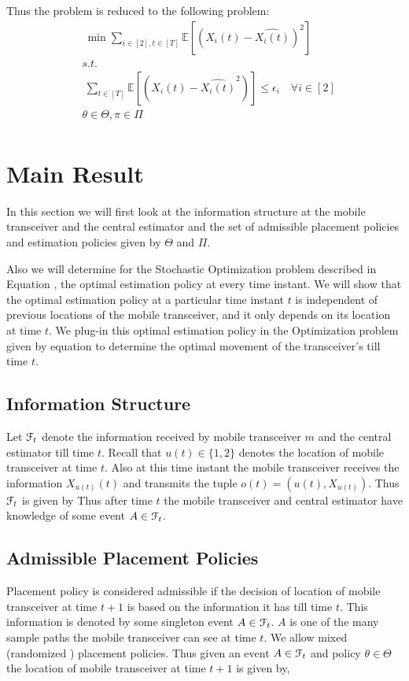 \documentclass[a4paper,english,12pt]{article}
\begin{document}
Thus the problem is reduced to the following problem:
\begin{align}\label{Opt}
& \ \min \sum_{i \in [2], t \in [T]} \mathbb{E}[ (X_i(t)-\hat{X_i(t)})^2]\\
& s.t. \nonumber\\
 &\ \sum_{t \in [T]} \mathbb{E}[(X_i(t)-\hat{X_i(t)}^2)] \leq \epsilon_i \quad \forall i \in [2] \nonumber\\
& \theta \in \Theta , \pi \in \Pi\nonumber\\
\nonumber
\end{align}

\section{Main Result}
In this section we  will first look at the information structure at the mobile transceiver and the central estimator and the set of admissible placement policies and estimation policies given by $\Theta$ and $\Pi$.

Also we will determine for the Stochastic Optimization problem described in Equation , the optimal estimation policy  at every time instant. We will show that the optimal estimation policy at a particular time instant $t$ is independent of  previous locations of the mobile transceiver, and it only depends on its location at time $t$. We plug-in this optimal estimation policy in the Optimization problem given by equation  to determine the optimal movement of the transceiver's till time $t$.
\subsection{Information Structure }
Let $\mathcal{F}_t$ denote the information received by mobile transceiver $m$ and the central estimator till time $t$. Recall that $u(t) \in \{1,2\}$ denotes the location of mobile transceiver at time $t$. Also at this time instant the mobile transceiver receives the information $X_{u(t)}(t)$ and transmits the tuple $o(t)=(u(t), X_{u(t)})$. Thus $\mathcal{F}_t$  is given by  Thus after time $t$ the mobile transceiver and central estimator have knowledge of some event $ A \in \mathcal{F}_t$.
\subsection{Admissible Placement Policies }\label{APP}
Placement policy is considered admissible if the decision of location of mobile transceiver at time $t+1$ is based on the information it has till time $t$. This information is denoted by  some singleton event  $A \in \mathcal{F}_t$. $A$ is one of the many sample paths the mobile transceiver can see at time $t$.
  We allow  mixed (randomized ) placement policies. Thus given an event $A \in \mathcal{F}_t$ and policy $\theta \in \Theta$ the location of mobile transceiver at time $t+1$ is given by, 
\end{document}
